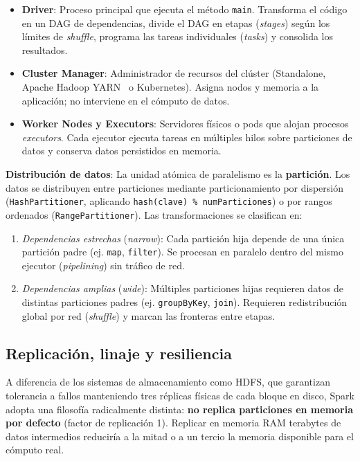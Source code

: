 \documentclass[conference,a4paper]{IEEEtran}
\begin{document}
\begin{itemize}
\item \textbf{Driver}: Proceso principal que ejecuta el método \texttt{main}. Transforma el código en un DAG de dependencias, divide el DAG en etapas (\textit{stages}) según los límites de \textit{shuffle}, programa las tareas individuales (\textit{tasks}) y consolida los resultados.
\item \textbf{Cluster Manager}: Administrador de recursos del clúster (Standalone, Apache Hadoop YARN~\cite{vavilapalli2013yarn} o Kubernetes). Asigna nodos y memoria a la aplicación; no interviene en el cómputo de datos.
\item \textbf{Worker Nodes y Executors}: Servidores físicos o pods que alojan procesos \textit{executors}. Cada ejecutor ejecuta tareas en múltiples hilos sobre particiones de datos y conserva datos persistidos en memoria.
\end{itemize}

\textbf{Distribución de datos}: La unidad atómica de paralelismo es la \textbf{partición}. Los datos se distribuyen entre particiones mediante particionamiento por dispersión (\texttt{HashPartitioner}, aplicando \texttt{hash(clave) \% numParticiones}) o por rangos ordenados (\texttt{RangePartitioner}). Las transformaciones se clasifican en:
\begin{enumerate}
\item \textit{Dependencias estrechas} (\textit{narrow}): Cada partición hija depende de una única partición padre (ej. \texttt{map}, \texttt{filter}). Se procesan en paralelo dentro del mismo ejecutor (\textit{pipelining}) sin tráfico de red.
\item \textit{Dependencias amplias} (\textit{wide}): Múltiples particiones hijas requieren datos de distintas particiones padres (ej. \texttt{groupByKey}, \texttt{join}). Requieren redistribución global por red (\textit{shuffle}) y marcan las fronteras entre etapas.
\end{enumerate}

\subsection{Replicación, linaje y resiliencia}

A diferencia de los sistemas de almacenamiento como HDFS, que garantizan tolerancia a fallos manteniendo tres réplicas físicas de cada bloque en disco, Spark adopta una filosofía radicalmente distinta: \textbf{no replica particiones en memoria por defecto} (factor de replicación 1). Replicar en memoria RAM terabytes de datos intermedios reduciría a la mitad o a un tercio la memoria disponible para el cómputo real.
\end{document}
